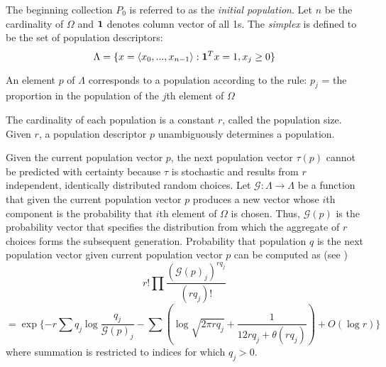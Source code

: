 The beginning collection $P_0$ is referred to as the {\em initial population}. Let $n$ be the cardinality of $\Omega$ and ${\bf1}$ denotes column vector of all 1s. The {\em simplex} is defined to be the set of population descriptors:
\[
\Lambda = \{x = \langle x_0,...,x_{n-1} \rangle: {\bf1}^T x=1, x_j \geq 0 \}
\]

An element $p$ of $\Lambda$ corresponds to a population according to the rule:
$p_j$ = the proportion in the population of the $j$th element of $\Omega$

The cardinality of each population is a constant $r$, called the population size. Given $r$, a population descriptor $p$ unambiguously determines a population.

Given the current population vector $p$, the next population vector $\tau(p)$ cannot be predicted with certainty because $\tau$ is stochastic 
and results from $r$ independent, identically distributed random choices. Let $\mathcal{G}:\Lambda \rightarrow \Lambda$ be a function that given the current population vector $p$ produces a new vector whose $i$th component is the probability that $i$th element of $\Omega$ is chosen. Thus, $\mathcal{G}(p)$ is the probability vector that specifies the distribution from which the aggregate of $r$ choices forms the subsequent generation.
Probability that population $q$ is the next population vector given current population vector $p$ can be computed as (see \cite{Vose1999}) 
\[
r! \prod \frac{(\mathcal{G}(p)_j)^{rq_j}}{(rq_j)!}
\]
\[
 = \exp\{-r \sum q_j \log \frac{q_j}{\mathcal{G}(p)_j} - \sum (\log \sqrt{2 \pi rq_j} + \frac{1}{12rq_j + \theta (rq_j)}) + O(\log r)\}
\]
where summation is restricted to indices for which $q_j > 0$.


